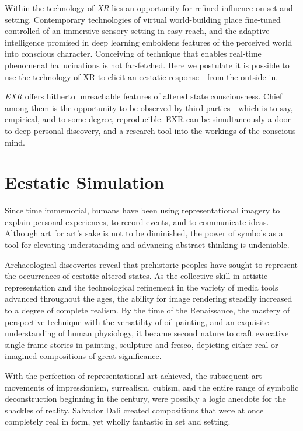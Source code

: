 \documentclass{UIdahoMastersThesis}
\begin{document}
Within the technology of \textit{\ac{XR}} lies an opportunity for refined influence on set and setting. Contemporary technologies of virtual world-building place fine-tuned controlled of an immersive sensory setting in easy reach, and the adaptive intelligence promised in deep learning emboldens features of the perceived world into conscious character. Conceiving of technique that enables real-time phenomenal hallucinations is not far-fetched. Here we postulate it is possible to use the technology of XR to elicit an ecstatic response---from the outside in.
 
\textit{\ac{EXR}} offers hitherto unreachable features of altered state consciousness. Chief among them is the opportunity to be observed by third parties---which is to say, empirical, and to some degree, reproducible. \ac{EXR} can be simultaneously a door to deep personal discovery, and a research tool into the workings of the conscious mind.


\section{Ecstatic Simulation}

Since time immemorial, humans have been using representational imagery to explain personal experiences, to record events, and to communicate ideas. Although art for art's sake is not to be diminished, the power of symbols as a tool for elevating understanding and advancing abstract thinking is undeniable.

Archaeological discoveries reveal that prehistoric peoples have sought to represent the occurrences of ecstatic altered states. As the collective skill in artistic representation and the technological refinement in the variety of media tools advanced throughout the ages, the ability for image rendering steadily increased to a degree of complete realism. By the time of the Renaissance, the mastery of perspective technique with the versatility of oil painting, and an exquisite understanding of human physiology, it became second nature to craft evocative single-frame stories in painting, sculpture and fresco, depicting either real or imagined compositions of great significance.  

With the perfection of representational art achieved, the subsequent art movements of impressionism, surrealism, cubism, and the entire range of symbolic deconstruction beginning in the  century, were possibly a logic anecdote for the shackles of reality. Salvador Dali created compositions that were at once completely real in form, yet wholly fantastic in set and setting.
\end{document}
